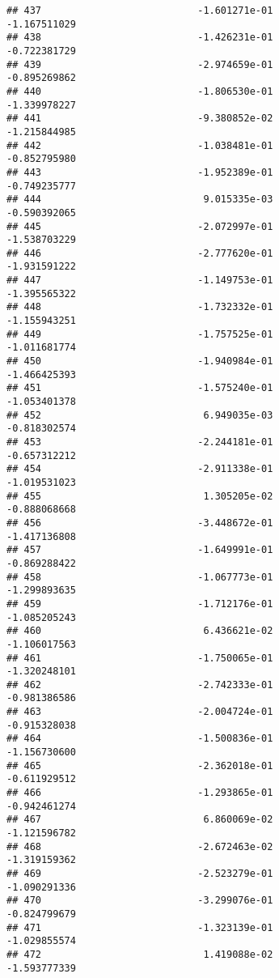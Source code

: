 \documentclass[
]{article}
\begin{document}
\begin{verbatim}
## 437                           -1.601271e-01               -1.167511029
## 438                           -1.426231e-01               -0.722381729
## 439                           -2.974659e-01               -0.895269862
## 440                           -1.806530e-01               -1.339978227
## 441                           -9.380852e-02               -1.215844985
## 442                           -1.038481e-01               -0.852795980
## 443                           -1.952389e-01               -0.749235777
## 444                            9.015335e-03               -0.590392065
## 445                           -2.072997e-01               -1.538703229
## 446                           -2.777620e-01               -1.931591222
## 447                           -1.149753e-01               -1.395565322
## 448                           -1.732332e-01               -1.155943251
## 449                           -1.757525e-01               -1.011681774
## 450                           -1.940984e-01               -1.466425393
## 451                           -1.575240e-01               -1.053401378
## 452                            6.949035e-03               -0.818302574
## 453                           -2.244181e-01               -0.657312212
## 454                           -2.911338e-01               -1.019531023
## 455                            1.305205e-02               -0.888068668
## 456                           -3.448672e-01               -1.417136808
## 457                           -1.649991e-01               -0.869288422
## 458                           -1.067773e-01               -1.299893635
## 459                           -1.712176e-01               -1.085205243
## 460                            6.436621e-02               -1.106017563
## 461                           -1.750065e-01               -1.320248101
## 462                           -2.742333e-01               -0.981386586
## 463                           -2.004724e-01               -0.915328038
## 464                           -1.500836e-01               -1.156730600
## 465                           -2.362018e-01               -0.611929512
## 466                           -1.293865e-01               -0.942461274
## 467                            6.860069e-02               -1.121596782
## 468                           -2.672463e-02               -1.319159362
## 469                           -2.523279e-01               -1.090291336
## 470                           -3.299076e-01               -0.824799679
## 471                           -1.323139e-01               -1.029855574
## 472                            1.419088e-02               -1.593777339

\end{verbatim}
\end{document}
